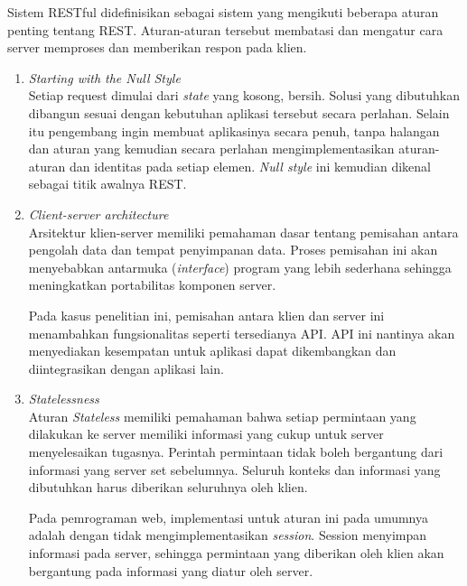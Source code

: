     Sistem RESTful didefinisikan sebagai sistem yang mengikuti beberapa aturan
    penting tentang REST\cite{rest:restful-web-service}. Aturan-aturan tersebut
    membatasi dan mengatur cara server memproses dan memberikan respon pada
    klien.
    \begin{enumerate}
        \item \textit{Starting with the Null Style}\\
            Setiap request dimulai dari \textit{state} yang kosong, bersih.
            Solusi yang dibutuhkan dibangun sesuai dengan kebutuhan aplikasi
            tersebut secara perlahan. Selain itu pengembang ingin membuat
            aplikasinya secara penuh, tanpa halangan dan aturan yang kemudian
            secara perlahan mengimplementasikan aturan-aturan dan identitas pada
            setiap elemen. \textit{Null style} ini kemudian dikenal sebagai
            titik awalnya REST.
            
        \item \textit{Client-server architecture}\\
            Arsitektur klien-server memiliki pemahaman dasar tentang pemisahan
            antara pengolah data dan tempat penyimpanan data. Proses pemisahan
            ini akan menyebabkan antarmuka (\textit{interface}) program yang
            lebih sederhana sehingga meningkatkan portabilitas komponen server.
            
            Pada kasus penelitian ini, pemisahan antara klien dan server ini
            menambahkan fungsionalitas seperti tersedianya API. API ini nantinya
            akan menyediakan kesempatan untuk aplikasi dapat dikembangkan dan
            diintegrasikan dengan aplikasi lain.
            
        \item \textit{Statelessness}\\
            Aturan \textit{Stateless} memiliki pemahaman bahwa setiap permintaan
            yang dilakukan ke server memiliki informasi yang cukup untuk server
            menyelesaikan tugasnya. Perintah permintaan tidak boleh bergantung
            dari informasi yang server set sebelumnya. Seluruh konteks dan
            informasi yang dibutuhkan harus diberikan seluruhnya oleh klien.
            
            
            Pada pemrograman web, implementasi untuk aturan ini pada umumnya
            adalah dengan tidak mengimplementasikan \textit{session}. Session
            menyimpan informasi pada server, sehingga permintaan yang diberikan
            oleh klien akan bergantung pada informasi yang diatur oleh server.
        

\end{enumerate}
